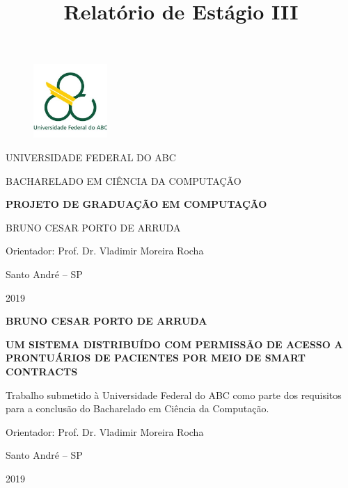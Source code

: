 \documentclass[a4paper,11pt]{article}
\title{Relatório de Estágio III}
\begin{document}


\begin{titlepage}

\begin{figure}
	\label{Logo UFABC}
	\vspace{-1\baselineskip}
	\centering
	\includegraphics[width=0.25\textwidth]{images/Logo_UFABC}
\end{figure}

\uppercase{Universidade Federal do ABC}

\uppercase{Bacharelado em Ciência da Computação}

\vfill
\begin{center}

\uppercase{\textbf{Projeto de Graduação em Computação}}

\vfill

\uppercase{Bruno Cesar Porto de Arruda}
\vspace{1cm}

Orientador: Prof. Dr. Vladimir Moreira Rocha

\vfill

Santo André -- SP

2019
\end{center}
\end{titlepage}



\begin{titlepage}
\begin{center}
\uppercase{\textbf{Bruno Cesar Porto de Arruda}}

\vfill

\uppercase{\textbf{Um sistema distribuído com permissão de acesso a prontuários de pacientes por meio de Smart Contracts}}
\end{center}

\vfill

\hfill \begin{minipage}{0.5\textwidth}
Trabalho submetido à Universidade Federal do ABC como parte dos requisitos para a conclusão do Bacharelado em Ciência da Computação.
\vspace{1cm}

Orientador: Prof. Dr. Vladimir Moreira Rocha
\end{minipage}

\vfill

\begin{center}
Santo André -- SP

2019
\end{center}
\end{titlepage}
\end{document}

